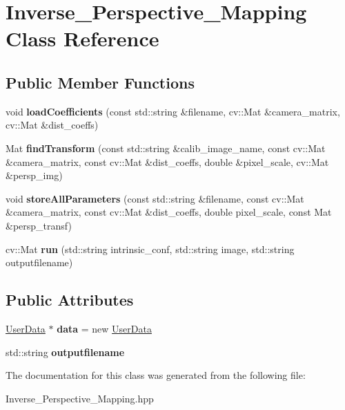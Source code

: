 \hypertarget{class_inverse___perspective___mapping}{}\section{Inverse\+\_\+\+Perspective\+\_\+\+Mapping Class Reference}
\label{class_inverse___perspective___mapping}
\subsection*{Public Member Functions}
\begin{DoxyCompactItemize}
\item 
\mbox{\label{class_inverse___perspective___mapping_a60f8dbac68fadb20b085bfbcef293480}} 
void {\bfseries load\+Coefficients} (const std\+::string \&filename, cv\+::\+Mat \&camera\+\_\+matrix, cv\+::\+Mat \&dist\+\_\+coeffs)
\item 
\mbox{\label{class_inverse___perspective___mapping_aa4444fc0f5e10cab7f408d6679be73db}} 
Mat {\bfseries find\+Transform} (const std\+::string \&calib\+\_\+image\+\_\+name, const cv\+::\+Mat \&camera\+\_\+matrix, const cv\+::\+Mat \&dist\+\_\+coeffs, double \&pixel\+\_\+scale, cv\+::\+Mat \&persp\+\_\+img)
\item 
\mbox{\label{class_inverse___perspective___mapping_abdea95329f3868f2a0875832a67f1076}} 
void {\bfseries store\+All\+Parameters} (const std\+::string \&filename, const cv\+::\+Mat \&camera\+\_\+matrix, const cv\+::\+Mat \&dist\+\_\+coeffs, double pixel\+\_\+scale, const Mat \&persp\+\_\+transf)
\item 
\mbox{\label{class_inverse___perspective___mapping_ad95385fefc56350a732760d7c68fe6a3}} 
cv\+::\+Mat {\bfseries run} (std\+::string intrinsic\+\_\+conf, std\+::string image, std\+::string outputfilename)
\end{DoxyCompactItemize}
\subsection*{Public Attributes}
\begin{DoxyCompactItemize}
\item 
\mbox{\label{class_inverse___perspective___mapping_ac329ac1aeac8b367c0c57b181b43244b}} 
\mbox{\hyperlink{struct_user_data}{User\+Data}} $\ast$ {\bfseries data} = new \mbox{\hyperlink{struct_user_data}{User\+Data}}
\item 
\mbox{\label{class_inverse___perspective___mapping_acb3b0ab469c2cd78d41ad0fd8c042767}} 
std\+::string {\bfseries outputfilename}
\end{DoxyCompactItemize}


The documentation for this class was generated from the following file\+:\begin{DoxyCompactItemize}
\item 
Inverse\+\_\+\+Perspective\+\_\+\+Mapping.\+hpp\end{DoxyCompactItemize}
